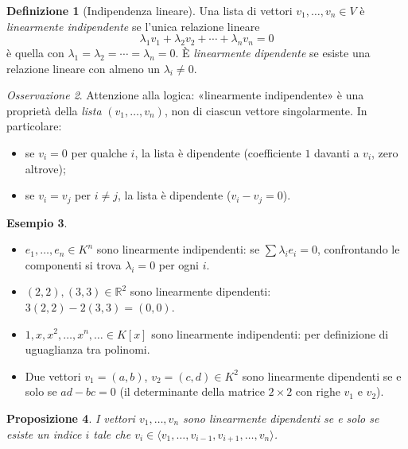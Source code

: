 \documentclass[11pt, a4paper]{book}
\theoremstyle{definition}
\newtheorem{definizione}{Definizione}[section]
\newtheorem{esempio}[definizione]{Esempio}
\theoremstyle{plain}
\newtheorem{proposizione}[definizione]{Proposizione}
\theoremstyle{remark}
\newtheorem{osservazione}[definizione]{Osservazione}
\newcommand{\R}{\mathbb{R}}
\begin{document}
\begin{defbox}
\begin{definizione}[Indipendenza lineare]
Una lista di vettori $v_1, \ldots, v_n \in V$ è \emph{linearmente indipendente} se l'unica relazione lineare
\[
  \lambda_1 v_1 + \lambda_2 v_2 + \cdots + \lambda_n v_n = 0
\]
è quella con $\lambda_1 = \lambda_2 = \cdots = \lambda_n = 0$. È \emph{linearmente dipendente} se esiste una relazione lineare con almeno un $\lambda_i \neq 0$.
\end{definizione}
\end{defbox}

\begin{osservazione}
Attenzione alla logica: «linearmente indipendente» è una proprietà della \emph{lista} $(v_1, \ldots, v_n)$, non di ciascun vettore singolarmente. In particolare:
\begin{itemize}
  \item se $v_i = 0$ per qualche $i$, la lista è dipendente (coefficiente $1$ davanti a $v_i$, zero altrove);
  \item se $v_i = v_j$ per $i \neq j$, la lista è dipendente ($v_i - v_j = 0$).
\end{itemize}
\end{osservazione}

\begin{exbox}
\begin{esempio}
\begin{itemize}
  \item $e_1, \ldots, e_n \in K^n$ sono linearmente indipendenti: se $\sum \lambda_i e_i = 0$, confrontando le componenti si trova $\lambda_i = 0$ per ogni $i$.
  \item $(2,2), (3,3) \in \R^2$ sono linearmente dipendenti: $3(2,2) - 2(3,3) = (0,0)$.
  \item $1, x, x^2, \ldots, x^n, \ldots \in K[x]$ sono linearmente indipendenti: per definizione di uguaglianza tra polinomi.
  \item Due vettori $v_1 = (a,b)$, $v_2 = (c,d) \in K^2$ sono linearmente dipendenti se e solo se $ad - bc = 0$ (il determinante della matrice $2 \times 2$ con righe $v_1$ e $v_2$).
\end{itemize}
\end{esempio}
\end{exbox}

\begin{proposizione}
I vettori $v_1, \ldots, v_n$ sono linearmente dipendenti se e solo se esiste un indice $i$ tale che $v_i \in \langle v_1, \ldots, v_{i-1}, v_{i+1}, \ldots, v_n \rangle$.
\end{proposizione}
\end{document}
